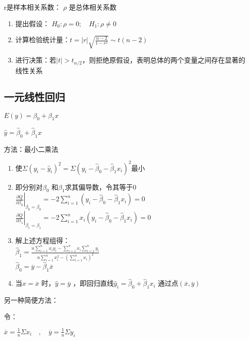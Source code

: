 \documentclass[UTF8,10pt]{book}
\begin{document}
r是样本相关系数： \(\rho\) 是总体相关系数

\begin{enumerate}
	\def\labelenumi{\arabic{enumi}.}
	\item
	提出假设： \( H_0:\rho=0; \quad H_1:\rho\neq 0 \)
	\item
	计算检验统计量：\( t = |r| \sqrt{  \frac{n-2}{1-r^2}   }   \sim t(n-2) \)
	\item
	进行决策：若\(|t|>t_{\alpha / 2}\)，则拒绝原假设，表明总体的两个变量之间存在显著的线性关系
\end{enumerate}

\subsection{一元线性回归}\label{header-n79}

\( E(y) = \beta_0 + \beta_1 x  \)

\( \hat{y} = \hat{\beta}_0 + \hat{\beta}_1 x \)

方法：最小二乘法

\begin{enumerate}
	\def\labelenumi{\arabic{enumi}.}
	\item
	使\(\Sigma(y_i - \hat{y}_i)^2 = \Sigma(y_i - \hat{\beta}_0 - \hat{\beta}_1 x_i)^2\)最小
	\item
	即分别对\(\beta_{0}\) 和\(\beta_{1}\)求其偏导数，令其等于0\\
	\( \left.   \frac{\partial Q}{\partial \beta_0}\right|_{\beta_0 = \hat{\beta}_0}  = -2 \sum_{i=1}^n (y_i - \hat{\beta}_0 - \hat{\beta}_1 x_i) = 0   \)\\
	\( \left.   \frac{\partial Q}{\partial \beta_1}\right|_{\beta_1 = \hat{\beta}_1}  = -2 \sum_{i=1}^n x_i(y_i - \hat{\beta}_0 - \hat{\beta}_1 x_i) = 0   \)
	\item
	解上述方程组得：\\
	\( \hat{\beta}_1 = \frac{n \sum_{i=1}^n x_i y_i - \sum_{i=1}^n x_i \sum_{i=1}^n y_i}{n \sum_{i=1}^n x_i^2 - \left(\sum_{i=1}^n x_i\right)^2}    \)
	\\
	\(\hat{\beta}_{0} = \overline{y} - \hat{\beta}_1 \overline{x}\)
	\item
	当\(x=\overline{x}\) 时，\(\hat{y}=\overline{y}\)
	，即回归直线\(\hat{y}_i=\hat{\beta}_0+\hat{\beta}_1 x_i\)
	通过点\((\overline{x},\overline{y})\)
\end{enumerate}

另一种简便方法：

令：

\(  \overline{x}=\frac{1}{n}\Sigma x_i   \quad , \quad \overline{y}=\frac{1}{n}\Sigma y_i \)
\end{document}
